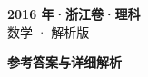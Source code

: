 \documentclass[zihao=-4, a4paper]{ctexart}
\begin{document}
\begin{center}
  {\Large\bfseries 2016 年·浙江卷·理科}\\[4pt]
  {\large 数学 · 解析版}
\end{center}
\medskip
{}

\clearpage
{}
\begin{center}{\Large\bfseries 参考答案与详细解析}\end{center}
\medskip

\end{document}
